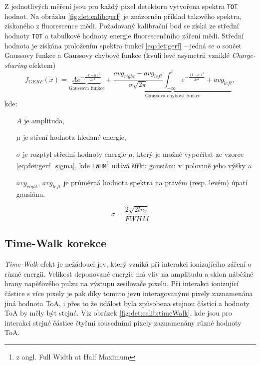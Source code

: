 Z jednotlivých měření jsou pro každý pixel detektoru vytvořena spektra \texttt{TOT} hodnot. Na obrázku \ref{fig:det:calib:gerf} je znázorněn příklad takového spektra, získaného z fluorescence mědi. Požadovaný kalibrační bod se získá ze střední hodnoty \texttt{TOT} a tabulkové hodnoty energie fluorescenčního záření mědi. Střední hodnota je získána proložením spektra funkcí \ref{eq:det:gerf} -- jedná se o součet Gaussovy funkce a Gaussovy chybové funkce (kvůli levé asymetrii vzniklé \textit{Charge-sharing} efektem)
\begin{equation}\label{eq:det:gerf}
	f_{GERF}(x) = \underbrace{Ae^{ -\frac{(x-\mu)^2}{2\sigma^2} }}_{\text{Gaussova funkce}} +
	\underbrace{ \frac{avg_{right} - avg_{left}}{\sigma\sqrt{2\pi}} \int_{-\infty}^t e^{ -\frac{(t-\mu)^2}{2\sigma^2} } + avg_{left}}_{\text{Gaussova chybová funkce}},
\end{equation}
kde:
\begin{changemargin}{1.5cm}{1cm} 
	\begin{itemize}
		\item [$A$] je amplituda,
		\item [$\mu$] je stření hodnota hledané energie,
		\item [$\sigma$] je rozptyl střední hodnoty energie $\mu$, který je možné vypočítat ze vzorce 
			\ref{eq:det:gerf_sigma}, kde \texttt{FWHM}\footnote{z angl. Full Width at Half Maximum} udává šířku gausiánu v~polovině jeho výšky a
		\item [$avg_{right}$, $avg_{left}$] je průměrná hodnota spektra na pravém (resp. levém) úpatí gausiánu.
	\end{itemize}
\end{changemargin}

\begin{equation}\label{eq:det:gerf_sigma}
	\sigma = \frac{2\sqrt{2ln_2}}{FWHM}
\end{equation}

\subsection{Time-Walk korekce}\label{chap:detectors:calibration:timeWalk}

\textit{Time-Walk} efekt je nežádoucí jev, který vzniká při interakci ionizujícího záření o různé energii. Velikost deponované energie má vliv na amplitudu a sklon náběžné hrany napěťového pulzu na výstupu zesilovače pixelu. Při interakci ionizující částice s více pixely je pak díky tomuto jevu interagovanými pixely zaznamenána jiná hodnota ToA, i přes to že událost byla způsobena stejnou částicí a hodnoty ToA by měly být stejné. Viz obrázek \ref{fig:det:calib:timeWalk}, kde jsou pro interakci stejné částice čtyřmi sousedními pixely zaznamenány různé hodnoty ToA. 

